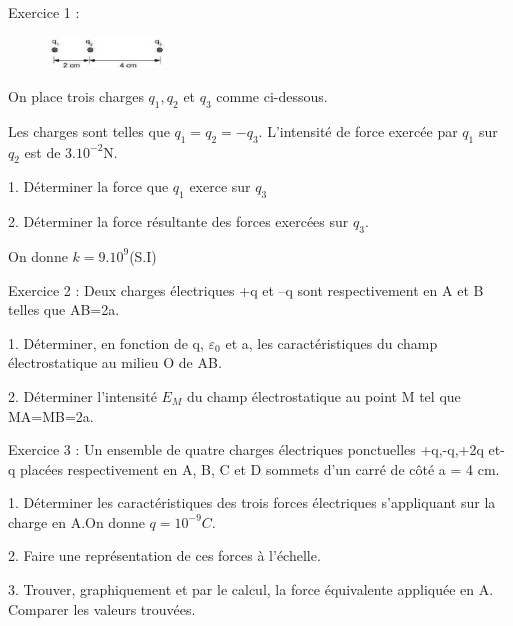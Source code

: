 \documentclass[12pt, french]{article}
\begin{document}
\begin{center}
\end{center}


   \begin{Box2}{Exercice 1 : }
      \begin{figure}
  \begin{center}
     \vspace{0.25cm}
    \includegraphics[width=0.28\textwidth]{./img/img_00.png}
  \end{center}
\end{figure}
      On place trois charges $q_1, q_2$ et $q_3$ comme ci-dessous. 

      Les charges sont telles que $q_1 = q_2 = -q_3$. L'intensité de force exercée par $q_1$ sur $q_2$ est de $3.10^{-2}$N.

1. Déterminer la force que $q_1$ exerce sur $q_3$

2. Déterminer la force résultante des forces exercées sur $q_3$.

On donne $k= 9.10^9$(S.I)
\end{Box2}


\begin{Box2}{Exercice 2 : }
Deux charges électriques +q et –q sont respectivement en A et B telles que AB=2a.

1. Déterminer, en fonction de q, $\varepsilon_0$ et a, les caractéristiques du champ électrostatique au milieu O de AB.

   2. Déterminer l’intensité $E_M$ du champ électrostatique au point M tel que MA=MB=2a.
\end{Box2}

\begin{Box2}{Exercice 3 :}
Un ensemble de quatre charges électriques ponctuelles +q,-q,+2q et-q placées
respectivement en A, B, C et D sommets d’un carré de côté a = 4 cm.

1. Déterminer les caractéristiques des trois forces électriques s’appliquant sur la charge en A.On donne $q = 10^{-9} C$.

2. Faire une représentation de ces forces à l’échelle.

3. Trouver, graphiquement et par le calcul, la force équivalente appliquée en A. Comparer les valeurs trouvées.
\end{Box2}
\end{document}
